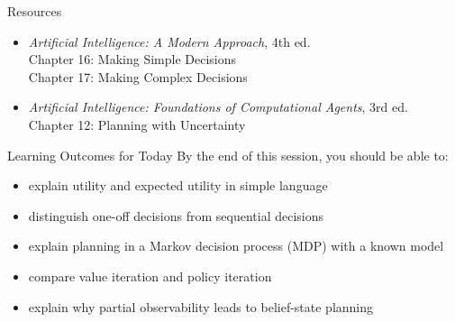 \documentclass[aspectratio=169]{beamer}
\begin{document}
\begin{frame}{Resources}
\begin{itemize}
  \item \textit{Artificial Intelligence: A Modern Approach}, 4th ed.\\
  Chapter 16: Making Simple Decisions\\
  Chapter 17: Making Complex Decisions
  \item \textit{Artificial Intelligence: Foundations of Computational Agents}, 3rd ed.\\
  Chapter 12: Planning with Uncertainty
\end{itemize}
\end{frame}

\begin{frame}{Learning Outcomes for Today}
By the end of this session, you should be able to:
\begin{itemize}
  \item explain utility and expected utility in simple language
  \item distinguish one-off decisions from sequential decisions
  \item explain planning in a Markov decision process (MDP) with a known model
  \item compare value iteration and policy iteration
  \item explain why partial observability leads to belief-state planning
\end{itemize}
\end{frame}
\end{document}
